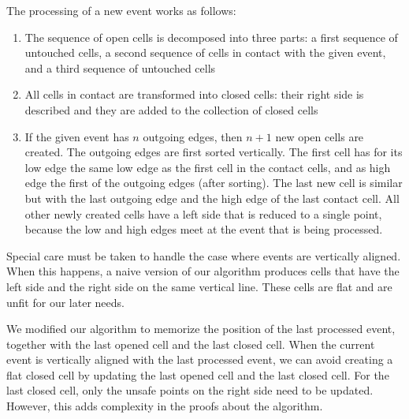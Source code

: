 \documentclass{easychair}
\begin{document}
The processing of a new event works as follows:
\begin{enumerate}
\item The sequence of open cells is decomposed into three parts:
a first sequence of untouched cells, a second sequence of cells in
contact with the given event, and a third sequence of
untouched cells
\item All cells in contact are transformed into closed cells:
their right side is
  described and they are added to the collection of closed cells
\item If the given event has \(n\) outgoing edges, then \(n+1\) new
  open cells are created.  The outgoing edges are first sorted vertically.
  The first cell has for its low edge the
  same low edge as the first cell in the contact cells, and
  as high edge the first of the outgoing edges (after sorting).  The
  last new cell is similar but with the last outgoing edge and the
  high edge of the last contact cell.  All other newly created cells have a
  left side that is reduced to a single point, because the low and
  high edges meet at the event that is being processed.
\end{enumerate}

Special care must be taken to handle the case where events are
vertically aligned.  When this happens, a naive version of our
algorithm produces cells that have the left side and the right side on the
same vertical line.  These cells are flat and are unfit for our later needs.

We modified our algorithm to memorize the
position of the last processed event, together with the last opened
cell and the last closed cell.  When the current event is vertically
aligned with the last processed event, we can avoid creating a flat
closed cell by updating the last opened cell and the last closed
cell.  For the last closed cell, only the unsafe points on the right side
need to be updated.  However, this adds complexity in the proofs about the
algorithm.
\end{document}
